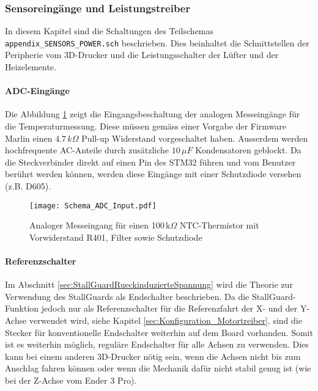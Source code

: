 \subsubsection{Sensoreingänge und Leistungstreiber}
\label{sec:SensoreingaengUndLeistungstreiber}

In diesem Kapitel sind die Schaltungen des Teilschemas \texttt{appendix\_SENSORS\_POWER.sch} beschrieben.
Dies beinhaltet die Schnittstellen der Peripherie vom 3D-Drucker und die Leistungsschalter der Lüfter und der Heizelemente.\\

\paragraph{ADC-Eingänge}
Die Abbildung \ref{pic:Schema_ADCin} zeigt die Eingangsbeschaltung der analogen Messeingänge für die Temperaturmessung. Diese müssen gemäss einer Vorgabe der Firmware Marlin einen $4.7\,\si{k\Omega}$ Pull-up Widerstand vorgeschaltet haben. Ausserdem werden hochfrequente AC-Anteile durch  zusätzliche $10\,\si{\mu F}$ Kondensatoren geblockt.
Da die Steckverbinder direkt auf einen Pin des STM32 führen und vom Benutzer berührt werden können, werden diese Eingänge mit einer Schutzdiode versehen (z.B. D605).

\begin{figure}[H]
	\centering
	\texttt{[image: Schema\_ADC\_Input.pdf]}
	\caption{Analoger Messeingang für einen 100\,k$\Omega$ NTC-Thermistor mit Vorwiderstand R401, Filter sowie Schutzdiode}
	\label{pic:Schema_ADCin}
\end{figure}

\paragraph{Referenzschalter}
Im Abschnitt \ref{sec:StallGuardRueckinduzierteSpannung} wird die Theorie zur Verwendung des StallGuards als Endschalter beschrieben. Da die StallGuard-Funktion jedoch nur als Referenzschalter für die Referenzfahrt der X- und der Y-Achse verwendet wird, siehe Kapitel \ref{sec:Konfiguration_Motortreiber}, sind die Stecker für konventionelle Endschalter weiterhin auf dem Board vorhanden.
Somit ist es weiterhin möglich, reguläre Endschalter für alle Achsen zu verwenden. Dies kann bei einem anderen 3D-Drucker nötig sein, wenn die Achsen nicht bis zum Anschlag fahren können oder wenn die Mechanik dafür nicht stabil genug ist (wie bei der Z-Achse vom Ender 3 Pro).

